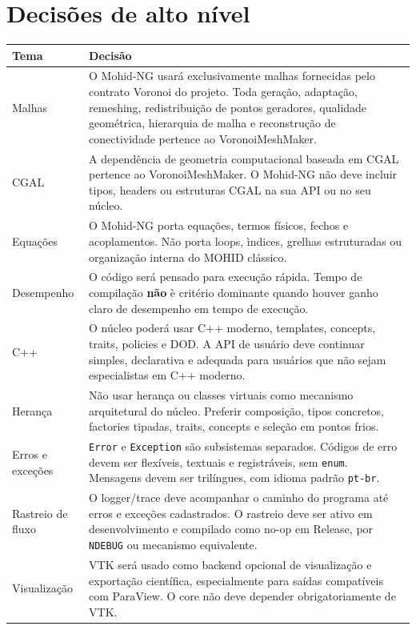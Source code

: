 \documentclass[11pt,a4paper]{article}
\begin{document}
\section{Decis\~oes de alto n\'ivel}

\begin{longtable}{p{}p{}}
\toprule
\textbf{Tema} & \textbf{Decis\~ao}\tabularnewline
\midrule
Malhas & O Mohid-NG usar\'a exclusivamente malhas fornecidas pelo contrato Voronoi do projeto. Toda gera\c{c}\~ao, adapta\c{c}\~ao, remeshing, redistribui\c{c}\~ao de pontos geradores, qualidade geom\'etrica, hierarquia de malha e reconstru\c{c}\~ao de conectividade pertence ao VoronoiMeshMaker.\tabularnewline
\addlinespace
CGAL & A depend\^encia de geometria computacional baseada em CGAL pertence ao VoronoiMeshMaker. O Mohid-NG n\~ao deve incluir tipos, headers ou estruturas CGAL na sua API ou no seu n\'ucleo.\tabularnewline
\addlinespace
Equa\c{c}\~oes & O Mohid-NG porta equa\c{c}\~oes, termos f\'isicos, fechos e acoplamentos. N\~ao porta loops, \`indices, grelhas estruturadas ou organiza\c{c}\~ao interna do MOHID cl\'assico.\tabularnewline
\addlinespace
Desempenho & O c\'odigo ser\'a pensado para execu\c{c}\~ao r\'apida. Tempo de compila\c{c}\~ao \textbf{n\~ao} \`e crit\'erio dominante quando houver ganho claro de desempenho em tempo de execu\c{c}\~ao.\tabularnewline
\addlinespace
C++ & O n\'ucleo poder\'a usar C++ moderno, templates, concepts, traits, policies e DOD. A API de usu\'ario deve continuar simples, declarativa e adequada para usu\'arios que n\~ao sejam especialistas em C++ moderno.\tabularnewline
\addlinespace
Heran\c{c}a & N\~ao usar heran\c{c}a ou classes virtuais como mecanismo arquitetural do n\'ucleo. Preferir composi\c{c}\~ao, tipos concretos, factories tipadas, traits, concepts e sele\c{c}\~ao em pontos frios.\tabularnewline
\addlinespace
Erros e exce\c{c}\~oes & \texttt{Error} e \texttt{Exception} s\~ao subsistemas separados. C\'odigos de erro devem ser flex\'iveis, textuais e registr\'aveis, sem \texttt{enum}. Mensagens devem ser tril\'ingues, com idioma padr\~ao \texttt{pt-br}.\tabularnewline
\addlinespace
Rastreio de fluxo & O logger/trace deve acompanhar o caminho do programa at\'e erros e exce\c{c}\~oes cadastrados. O rastreio deve ser ativo em desenvolvimento e compilado como no-op em Release, por \texttt{NDEBUG} ou mecanismo equivalente.\tabularnewline
\addlinespace
Visualiza\c{c}\~ao & VTK ser\'a usado como backend opcional de visualiza\c{c}\~ao e exporta\c{c}\~ao cient\'ifica, especialmente para sa\'idas compat\'iveis com ParaView. O core n\~ao deve depender obrigatoriamente de VTK.\tabularnewline

\end{longtable}
\end{document}
